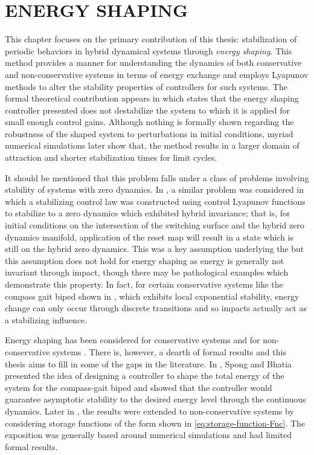 \chapter{\uppercase{Energy Shaping}} \label{ch:energy-shaping}

This chapter focuses on the primary contribution of this thesis: stabilization
 of periodic behaviors in hybrid dynamical systems through {\em energy shaping}.
%
This method provides a manner for understanding the dynamics of both
conservative and  non-conservative systems in terms of energy exchange and
employs Lyapunov methods to alter the stability properties of controllers for
such systems.
%
The formal theoretical contribution appears in 
which states that the energy shaping controller presented does not destabilize
the system to which it is applied for small enough control gains.
%
Although nothing is formally shown regarding the robustness of the shaped system
to perturbations in initial conditions, myriad numerical simulations later show
that, the method results in a larger domain of attraction and shorter
stabilization times for limit cycles.

It should be mentioned that this problem falls under a class of problems
involving stability of systems with zero dynamics.
%
In \cite{Ames2014}, a similar problem was considered in which a stabilizing
control law was constructed using control Lyapunov functions to stabilize to a
zero dynamics which exhibited hybrid invariance;
%
that is, for initial conditions on the intersection of the switching surface and
the hybrid zero dynamics manifold, application of the reset map will result in a
state which is still on the hybrid zero dynamics.
%
This was a key assumption underlying the \cite{Ames2014} but this assumption
does not hold for energy shaping as energy is generally not invariant through
impact, though there may be pathological examples which demonstrate this
property.
%
In fact, for certain conservative systems like the compass gait biped shown in
, which exhibits local exponential
stability, energy change can only occur through discrete transitions and so
impacts actually act as a stabilizing influence.

Energy shaping has been considered for conservative systems \cite{Spong2003} and
for non-conservative systems \cite{Spong2007}.
%
There is, however, a dearth of formal results and this thesis aims to fill in
some of the gaps in the literature.
%
In \cite{Spong2003}, Spong and Bhatia presented the idea of designing a
controller to shape the total energy of the system for the compass-gait biped
and showed that the controller would guarantee asymptotic stability to the
desired energy level through the continuous dynamics.
%
Later in \cite{Spong2007}, the results were extended to non-conservative systems
by considering storage functions of the form shown in
\eqref{eq:storage-function-Fnc}.
%
The exposition was generally based around numerical simulations and had limited
formal results.

